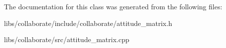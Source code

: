 The documentation for this class was generated from the following files\+:\begin{DoxyCompactItemize}
\item 
libs/collaborate/include/collaborate/attitude\+\_\+matrix.\+h\item 
libs/collaborate/src/attitude\+\_\+matrix.\+cpp\end{DoxyCompactItemize}
